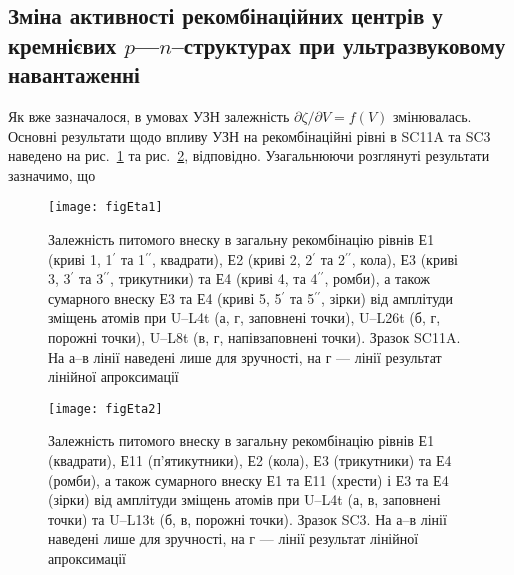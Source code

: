 \subsection{Зміна активності рекомбінаційних центрів у кремнієвих $p$---$n$--структурах при ультразвуковому навантаженні\label{sbBul3}}

Як вже зазначалося, в умовах УЗН залежність $\partial \zeta/ \partial V = f (V)$ змінювалась.
Основні результати щодо впливу УЗН на рекомбінаційні рівні в SC11A та SC3 наведено
на рис.~\ref{figEta1} та рис.~\ref{figEta2}, відповідно.
Узагальнюючи розглянуті результати зазначимо, що


\begin{figure}
\center
\texttt{[image: figEta1]}
\caption{\label{figEta1}
Залежність питомого внеску в загальну рекомбінацію рівнів
Е1 (криві 1, 1$^{\prime}$ та 1$^{\prime\prime}$, квадрати),
Е2 (криві 2, 2$^{\prime}$ та 2$^{\prime\prime}$, кола),
Е3 (криві 3, 3$^{\prime}$ та 3$^{\prime\prime}$, трикутники)
та Е4 (криві 4, та 4$^{\prime\prime}$, ромби),
а також сумарного внеску
Е3 та Е4 (криві 5, 5$^{\prime}$ та 5$^{\prime\prime}$, зірки)
від амплітуди зміщень атомів
при U--L4t (а, г, заповнені точки),
U--L26t (б, г, порожні точки),
U--L8t (в, г, напівзаповнені точки).
Зразок SC11A.
На а--в лінії наведені лише для зручності,
на г --- лінії результат лінійної апроксимації
}%
\end{figure}

\begin{figure}
\center
\texttt{[image: figEta2]}
\caption{\label{figEta2}
Залежність питомого внеску в загальну рекомбінацію рівнів
Е1 (квадрати),
Е11 (п'ятикутники),
Е2 (кола),
Е3 (трикутники)
та Е4 (ромби),
а також сумарного внеску
Е1 та Е11 (хрести) і
Е3 та Е4 (зірки)
від амплітуди зміщень атомів
при U--L4t (а, в, заповнені точки) та
U--L13t (б, в, порожні точки).
Зразок SC3.
На а--в лінії наведені лише для зручності,
на г --- лінії результат лінійної апроксимації
}%
\end{figure}

